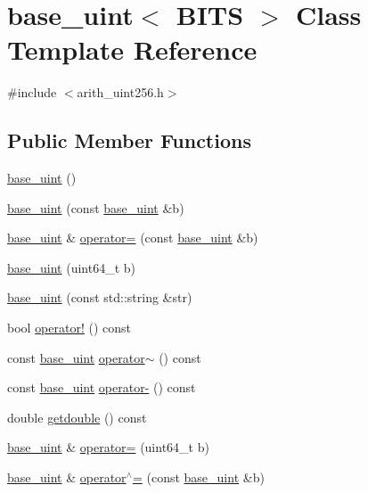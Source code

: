 \hypertarget{classbase__uint}{}\section{base\+\_\+uint$<$ B\+I\+T\+S $>$ Class Template Reference}
\label{classbase__uint}


{\ttfamily \#include $<$arith\+\_\+uint256.\+h$>$}

\subsection*{Public Member Functions}
\begin{DoxyCompactItemize}
\item 
\hyperlink{classbase__uint_aafd4418923a92b58a1c360e657fa7d83}{base\+\_\+uint} ()
\item 
\hyperlink{classbase__uint_a5d4e4c28c82c3a12b3689860081579c1}{base\+\_\+uint} (const \hyperlink{classbase__uint}{base\+\_\+uint} \&b)
\item 
\hyperlink{classbase__uint}{base\+\_\+uint} \& \hyperlink{classbase__uint_a0425a3c4d342b6fc9a68b1766cee9ede}{operator=} (const \hyperlink{classbase__uint}{base\+\_\+uint} \&b)
\item 
\hyperlink{classbase__uint_a217f9750f0ca9cdeefffb7bb1f1952d6}{base\+\_\+uint} (uint64\+\_\+t b)
\item 
\hyperlink{classbase__uint_aa1ebaba47302da3e120879d186355736}{base\+\_\+uint} (const std\+::string \&str)
\item 
bool \hyperlink{classbase__uint_a0f528438872245b8fc54ff60bbb6118a}{operator!} () const 
\item 
const \hyperlink{classbase__uint}{base\+\_\+uint} \hyperlink{classbase__uint_ad64a83e128fcf2d2ac072811a3e36300}{operator$\sim$} () const 
\item 
const \hyperlink{classbase__uint}{base\+\_\+uint} \hyperlink{classbase__uint_a29b620fba192a191054b35bf269ea221}{operator-\/} () const 
\item 
double \hyperlink{classbase__uint_aa701be5115bacf02c299b05598cf616d}{getdouble} () const 
\item 
\hyperlink{classbase__uint}{base\+\_\+uint} \& \hyperlink{classbase__uint_a115a5ddb2f2637e09703a25cfc580483}{operator=} (uint64\+\_\+t b)
\item 
\hyperlink{classbase__uint}{base\+\_\+uint} \& \hyperlink{classbase__uint_ad5ec10977ebeab115fe857637990e267}{operator$^\wedge$=} (const \hyperlink{classbase__uint}{base\+\_\+uint} \&b)

\end{DoxyCompactItemize}
